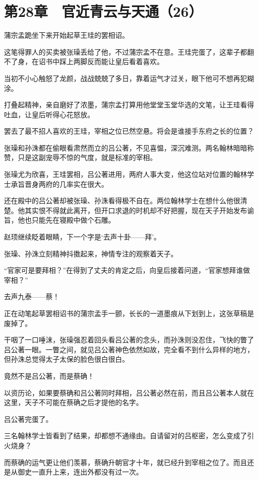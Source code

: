 \section{第28章　官近青云与天通（26）}

蒲宗孟跪坐下来开始起草王珪的罢相诏。

这笔得罪人的买卖被张璪丢给了他，不过蒲宗孟不在意。王珪完蛋了，这辈子都翻不了身，在诏书中踩上两脚反而能让皇后看着喜欢。

当初不小心触怒了龙颜，战战兢兢了多日，靠着运气才过关，眼下他可不想再犯糊涂。

打叠起精神，亲自磨好了浓墨，蒲宗孟打算用他堂堂玉堂华选的文笔，让王珪看得吐血，让皇后听得心花怒放。

罢去了最不招人喜欢的王珪，宰相之位已然空悬。将会是谁接手东府之长的位置？

张璪和孙洙都在偷眼看肃然而立的吕公著，不见喜愠，深沉难测。两名翰林暗暗称赞，只是这副宠辱不惊的气度，就是标准的宰相。

张璪尤为欣喜，王珪罢相，吕公著进用，两府人事大变，他这位站对位置的翰林学士承旨晋身两府的几率实在很大。

还在殿中的吕公著却被张璪、孙洙看得极不自在。两位翰林学士在想什么他很清楚。他其实恨不得就此离开，但开口求退的时机却不好把握，现在天子开始发布谕旨，他也只能先在寝殿中做个石雕。

赵顼继续眨着眼睛，下一个字是‘去声十卦——拜’。

张璪、孙洙立刻精神抖擞起来，神情专注的观察着天子。

“官家可是要拜相？”在得到了丈夫的肯定之后，向皇后接着问道，“官家想拜谁做宰相？”

去声九泰——蔡！

正在动笔起草罢相诏书的蒲宗孟手一颤，长长的一道墨痕从下划到上，这张草稿是废掉了。

干咽了一口唾沫，张璪强忍着回头看吕公著的念头，而孙洙则没忍住，飞快的瞥了吕公著一眼。一瞥之间，就见吕公著神色依然如故，完全看不到什么异样的地方，但孙洙总觉得太子太保的脸色很白很白。

竟然不是吕公著，而是蔡确！

以资历论，如果要蔡确和吕公著同时拜相，吕公著必然在前，而且吕公著本人就在这里，天子不可能在蔡确之后才提他的名字。

吕公著完蛋了。

三名翰林学士皆看到了结果，却都想不通缘由。自请留对的吕枢密，怎么变成了引火烧身？

而蔡确的运气更让他们羡慕，蔡确升朝官才十年，就已经升到宰相之位了。而且还是从御史一直升上来，连出外都没有过一次。

